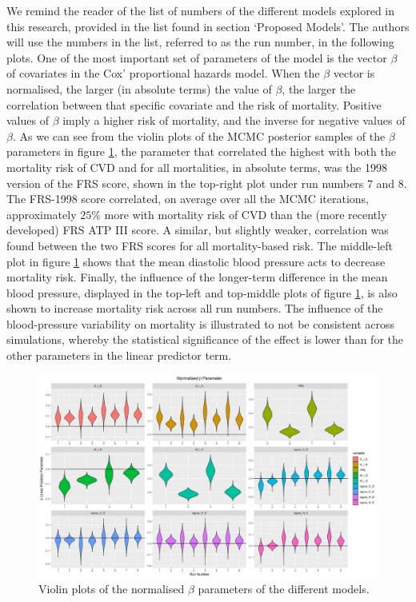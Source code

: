 \documentclass[
]{article}
\begin{document}
We remind the reader of the list of numbers of the different models explored in this research, provided in the list found in section `Proposed Models'. The authors will use the numbers in the list, referred to as the run number, in the following plots. One of the most important set of parameters of the model is the vector \(\beta\) of covariates in the Cox' proportional hazards model. When the \(\beta\) vector is normalised, the larger (in absolute terms) the value of \(\beta\), the larger the correlation between that specific covariate and the risk of mortality. Positive values of \(\beta\) imply a higher risk of mortality, and the inverse for negative values of \(\beta\). As we can see from the violin plots of the MCMC posterior samples of the \(\beta\) parameters in figure \ref{fig:betas}, the parameter that correlated the highest with both the mortality risk of CVD and for all mortalities, in absolute terms, was the 1998 version of the FRS score, shown in the top-right plot under run numbers 7 and 8. The FRS-1998 score correlated, on average over all the MCMC iterations, approximately \(25\%\) more with mortality risk of CVD than the (more recently developed) FRS ATP III score. A similar, but slightly weaker, correlation was found between the two FRS scores for all mortality-based risk. The middle-left plot in figure \ref{fig:betas} shows that the mean diastolic blood pressure acts to decrease mortality risk. Finally, the influence of the longer-term difference in the mean blood pressure, displayed in the top-left and top-middle plots of figure \ref{fig:betas}, is also shown to increase mortality risk across all run numbers. The influence of the blood-pressure variability on mortality is illustrated to not be consistent across simulations, whereby the statistical significance of the effect is lower than for the other parameters in the linear predictor term.

\begin{figure}
\hypertarget{fig:betas}{%
\centering
\includegraphics{./Plots/beta/Beta_parameter_normalised.png}
\caption{Violin plots of the normalised \(\beta\) parameters of the different models.}\label{fig:betas}
}
\end{figure}
\end{document}
